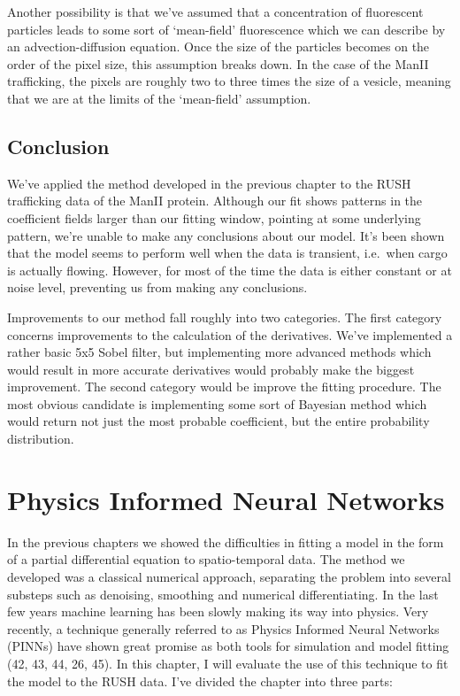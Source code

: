 \documentclass[12pt,a4paper,]{Dissertate}
\begin{document}
Another possibility is that we've assumed that a concentration of
fluorescent particles leads to some sort of `mean-field' fluorescence
which we can describe by an advection-diffusion equation. Once the size
of the particles becomes on the order of the pixel size, this assumption
breaks down. In the case of the ManII trafficking, the pixels are
roughly two to three times the size of a vesicle, meaning that we are at
the limits of the `mean-field' assumption.

\hypertarget{conclusion}{%
\section{Conclusion}\label{conclusion}}

We've applied the method developed in the previous chapter to the RUSH
trafficking data of the ManII protein. Although our fit shows patterns
in the coefficient fields larger than our fitting window, pointing at
some underlying pattern, we're unable to make any conclusions about our
model. It's been shown that the model seems to perform well when the
data is transient, i.e.~when cargo is actually flowing. However, for
most of the time the data is either constant or at noise level,
preventing us from making any conclusions.

Improvements to our method fall roughly into two categories. The first
category concerns improvements to the calculation of the derivatives.
We've implemented a rather basic 5x5 Sobel filter, but implementing more
advanced methods which would result in more accurate derivatives would
probably make the biggest improvement. The second category would be
improve the fitting procedure. The most obvious candidate is
implementing some sort of Bayesian method which would return not just
the most probable coefficient, but the entire probability distribution.

\hypertarget{physics-informed-neural-networks}{%
\chapter{Physics Informed Neural
Networks}\label{physics-informed-neural-networks}}

In the previous chapters we showed the difficulties in fitting a model
in the form of a partial differential equation to spatio-temporal data.
The method we developed was a classical numerical approach, separating
the problem into several substeps such as denoising, smoothing and
numerical differentiating. In the last few years machine learning has
been slowly making its way into physics. Very recently, a technique
generally referred to as Physics Informed Neural Networks (PINNs) have
shown great promise as both tools for simulation and model fitting (42,
43, 44, 26, 45). In this chapter, I will evaluate the use of this
technique to fit the model to the RUSH data. I've divided the chapter
into three parts:
\end{document}
